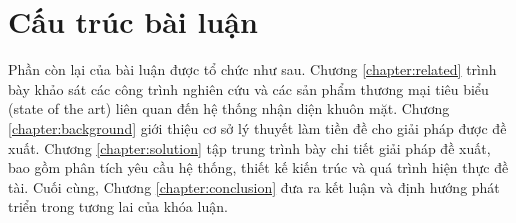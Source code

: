 \section{Cấu trúc bài luận}
Phần còn lại của bài luận được tổ chức như sau. Chương \ref{chapter:related} trình bày khảo sát các công trình nghiên cứu và các sản phẩm thương mại tiêu biểu (state of the art) liên quan đến hệ thống nhận diện khuôn mặt. Chương \ref{chapter:background} giới thiệu cơ sở lý thuyết làm tiền đề cho giải pháp được đề xuất. Chương \ref{chapter:solution} tập trung trình bày chi tiết giải pháp đề xuất, bao gồm phân tích yêu cầu hệ thống, thiết kế kiến trúc và quá trình hiện thực đề tài. Cuối cùng, Chương \ref{chapter:conclusion} đưa ra kết luận và định hướng phát triển trong tương lai của khóa luận.
